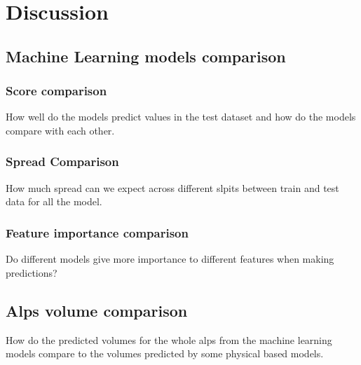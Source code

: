 \chapter{Discussion}\label{disc}
\thispagestyle{plain}

\section{Machine Learning models comparison}\label{MLcomp}

\subsection{Score comparison}
How well do the models predict values in the test dataset and how do the models compare with each other.

\subsection{Spread Comparison}
How much spread can we expect across different slpits between train and test data for all the model.

\subsection{Feature importance comparison}
Do different models give more importance to different features when making predictions?

\section{Alps volume comparison}\label{Alpscomp}
How do the predicted volumes for the whole alps from the machine learning models compare to the volumes predicted by some physical based models.

